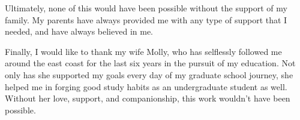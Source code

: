 Ultimately, none of this would have been possible without the support of my family.  My parents have always provided me with any type of support that I needed, and have always believed in me.  

Finally, I would like to thank my wife Molly, who has selflessly followed me around the east coast for the last six years in the pursuit of my education.  Not only has she supported my goals every day of my graduate school journey, she helped me in forging good study habits as an undergraduate student as well.  Without her love, support, and companionship, this work wouldn't have been possible.


